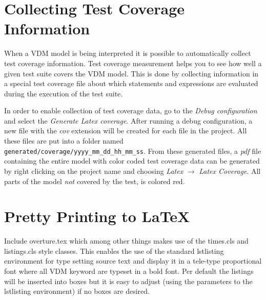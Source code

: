 \documentclass{overturerepchap}
\begin{document}

\chapter{Collecting Test Coverage Information}\label{sec:testcoverage}

When a VDM model is being interpreted it is possible to automatically
collect test coverage information. 
Test coverage measurement helps you to see
how well a given test suite covers the
VDM model. This is done by collecting information in a special
test coverage file about which statements and expressions are
evaluated during the execution of the test suite.

In order to enable collection of test coverage data, go to the \emph{Debug 
configuration} and select the \emph{Generate Latex coverage}. After running a 
debug configuration, a new file with the \emph{cov} extension will be created for 
each file in the project. All these files are put into a folder named
\texttt{generated/coverage/yyyy\_mm\_dd\_hh\_mm\_ss}. From these generated files,
a \emph{pdf} file containing the entire model with color coded test coverage data 
can be generated by right clicking on the project name and choosing
\emph{Latex} $\rightarrow$ \emph{Latex Coverage}. All parts of the model \emph{not}
covered by the test, is colored red.

\chapter{Pretty Printing to \LaTeX}\label{sec:prettyprint}

Include {\ttfamily overture.tex} which among other things makes use of
the {\ttfamily times.cls} and {\ttfamily listings.cls} style
classes. This enables the use of the standard {\ttfamily lstlisting}
environment for type setting source text and display it in a tele-type
proportional font where all VDM keyword are typeset in a bold
font. Per default the listings will be inserted into boxes but it is
easy to adjust (using the parameters to the {\ttfamily lstlisting}
environment) if no boxes are desired.
\end{document}
